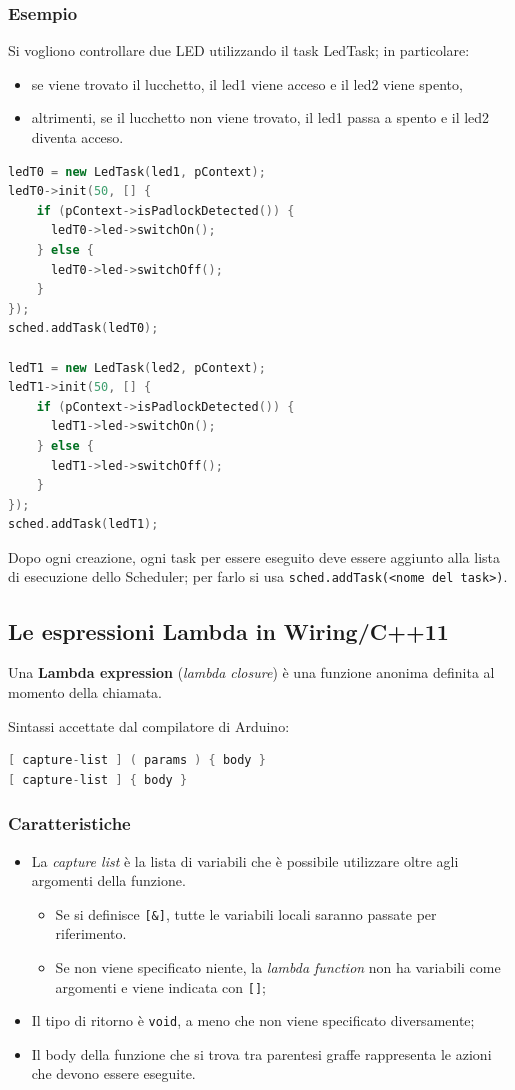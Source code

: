 \subsubsection{Esempio}
Si vogliono controllare due LED utilizzando il task LedTask; in particolare:
\begin{itemize}
	\item se viene trovato il lucchetto, il led1 viene acceso e il led2 viene spento,
	\item altrimenti, se il lucchetto non viene trovato, il led1 passa a spento e il led2 diventa acceso.
\end{itemize}
\begin{lstlisting}[language=C++]
ledT0 = new LedTask(led1, pContext);
ledT0->init(50, [] {
   	if (pContext->isPadlockDetected()) {
   	  ledT0->led->switchOn();
   	} else {
   	  ledT0->led->switchOff();
	}
});
sched.addTask(ledT0);

ledT1 = new LedTask(led2, pContext);
ledT1->init(50, [] {
   	if (pContext->isPadlockDetected()) {
	  ledT1->led->switchOn();
   	} else {
   	  ledT1->led->switchOff();
	}
});
sched.addTask(ledT1);
\end{lstlisting}

Dopo ogni creazione, ogni task per essere eseguito deve essere aggiunto alla lista di esecuzione dello Scheduler; per farlo si usa \texttt{sched.addTask(<nome del task>)}.

\subsection{Le espressioni Lambda in Wiring/C++11}\label{sec:lambda}
Una \textbf{Lambda expression} (\textit{lambda closure}) è una funzione anonima definita al momento della chiamata. 

Sintassi accettate dal compilatore di Arduino:
\begin{lstlisting}[language=C++]
[ capture-list ] ( params ) { body }
[ capture-list ] { body } 
\end{lstlisting}

\subsubsection{Caratteristiche}
\begin{itemize}
	\item La \textit{capture list} è la lista di variabili che è possibile utilizzare oltre agli argomenti della funzione.
	\begin{itemize}
		\item Se si definisce \texttt{[\&]}, tutte le variabili locali saranno passate per riferimento.
		\item Se non viene specificato niente, la \textit{lambda function} non ha variabili come argomenti e viene indicata con \texttt{[]};
	\end{itemize}
	\item Il tipo di ritorno è \texttt{void}, a meno che non viene specificato diversamente;
	\item Il body della funzione che si trova tra parentesi graffe rappresenta le azioni che devono essere eseguite.
\end{itemize}

